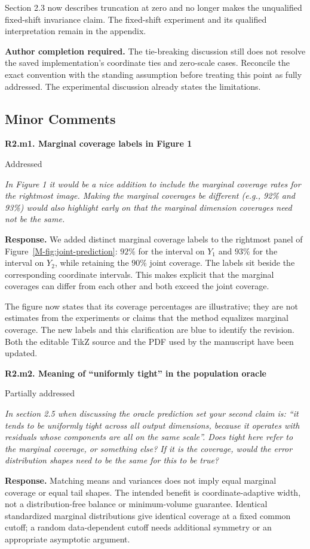 \documentclass[11pt]{article}
\newcommand{\msfig}[1]{Figure~\ref*{M-#1}}
\newcommand{\action}[1]{\par{\small\color{ActionRed}\textbf{Author completion required.} #1\par}}
\newcommand{\point}[3]{\par\Needspace{7\baselineskip}\medskip
\noindent\parbox[t]{0.77\linewidth}{\textbf{#1}}\hfill
\parbox[t]{0.21\linewidth}{\raggedleft\small\sffamily #2}\par\nopagebreak
{\color{ReviewerBlue}\small\itshape #3\par}\textbf{Response.} }
\begin{document}
Section 2.3 now describes truncation at zero and no longer makes the unqualified fixed-shift invariance claim. The fixed-shift experiment and its qualified interpretation remain in the appendix.

\action{The tie-breaking discussion still does not resolve the saved implementation's coordinate ties and zero-scale cases. Reconcile the exact convention with the standing assumption before treating this point as fully addressed. The experimental discussion already states the limitations.}

\subsection*{Minor Comments}

\point{R2.m1. Marginal coverage labels in Figure 1}{Addressed}{In Figure 1 it would be a nice addition to include the marginal
coverage rates for the rightmost image. Making the marginal
coverages be different (e.g., 92\% and 93\%) would also highlight
early on that the marginal dimension coverages need not be the same.}
\label{response:R2.m1}
We added distinct marginal coverage labels to the rightmost panel of \msfig{fig:joint-prediction}: $92\%$ for the interval on $Y_1$ and $93\%$ for the interval on $Y_2$, while retaining the $90\%$ joint coverage. The labels sit beside the corresponding coordinate intervals. This makes explicit that the marginal coverages can differ from each other and both exceed the joint coverage.

The figure now states that its coverage percentages are illustrative; they are not estimates from the experiments or claims that the method equalizes marginal coverage. The new labels and this clarification are blue to identify the revision. Both the editable TikZ source and the PDF used by the manuscript have been updated.

\point{R2.m2. Meaning of ``uniformly tight'' in the population oracle}{Partially addressed}{In section 2.5 when discussing the oracle prediction set your
second claim is: ``it tends to be uniformly tight across all
output dimensions, because it operates with residuals whose
components are all on the same scale''. Does tight here refer
to the marginal coverage, or something else? If it is the
coverage, would the error distribution shapes need to be the
same for this to be true?}
\label{response:R2.m2}
Matching means and variances does not imply equal marginal coverage or equal tail shapes. The intended benefit is coordinate-adaptive width, not a distribution-free balance or minimum-volume guarantee. Identical standardized marginal distributions give identical coverage at a fixed common cutoff; a random data-dependent cutoff needs additional symmetry or an appropriate asymptotic argument.
\end{document}
